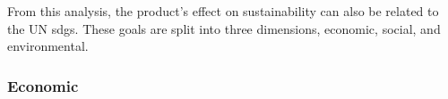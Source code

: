 From this analysis, the product's effect on sustainability can also be related to the UN \acrshort{sdg}s. These goals are split into three dimensions, economic, social, and environmental.

\subsubsection{Economic}\label{subsubsec:discussion:product:sustainability:economic}


